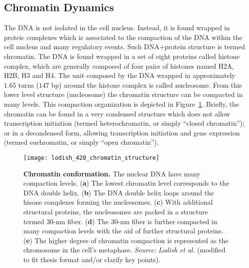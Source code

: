 \subsection{Chromatin Dynamics}
\label{sec:chromatin.dynamics}

The DNA is not isolated in the cell nucleus. Instead, it is found wrapped in proteic complexes which is associated to the compaction of the DNA within the cell nucleus and many regulatory events. Such DNA$+$protein structure is termed chromatin. The DNA is found wrapped in a set of eight proteins called histone complex, which are generally composed of four pairs of histones named H2A, H2B, H3 and H4. The unit composed by the DNA wrapped in approximately $1.65$ turns (\approxy$147$ bp) around the histone complex is called nucleosome. From this lower level structure (nucleosome) the chromatin structure can be compacted in many levels. This compaction organization is depicted in Figure~\ref{fig:lodish_chromatin_structure}. Briefly, the chromatin can be found in a very condensed structure which does not allow transcription initiation (termed heterochromatin, or simply ``closed chromatin''); or in a decondensed form, allowing transcription initiation and gene expression (termed euchromatin, or simply ``open chromatin'').

\begin{figure}[h!]
\centering
\texttt{[image: lodish\_420\_chromatin\_structure]}
\caption[Chromatin conformation]{\textbf{Chromatin conformation.} The nuclear DNA have many compaction levels. (\textbf{a}) The lowest chromatin level corresponds to the DNA double helix. (\textbf{b}) The DNA double helix loops around the hisone complexes forming the nucleosomes. (\textbf{c}) With additional structural proteins, the nucleosomes are packed in a structure termed $30$-nm fiber. (\textbf{d}) The $30$-nm fiber is further compacted in many compaction levels with the aid of further structural proteins. (\textbf{e}) The higher degree of chromatin compaction is represented as the chromosome in the cell's metaphase.  \emph{Source: Lodish et al.}\cite{lodish2007} (modified to fit thesis format and/or clarify key points).}
\label{fig:lodish_chromatin_structure}
\end{figure}

